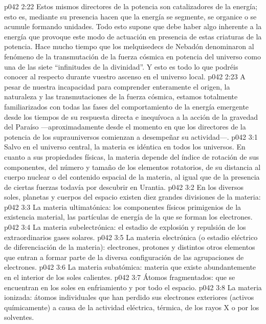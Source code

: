 \vs p042 2:22 Estos mismos directores de la potencia son catalizadores de la energía; esto es, mediante su presencia hacen que la energía se segmente, se organice o se acumule formando unidades. Todo esto supone que debe haber algo inherente a la energía que provoque este modo de actuación en presencia de estas criaturas de la potencia. Hace mucho tiempo que los melquisedecs de Nebadón denominaron al fenómeno de la transmutación de la fuerza cósmica en potencia del universo como una de las siete “infinitudes de la divinidad”. Y esto es todo lo que podréis conocer al respecto durante vuestro ascenso en el universo local.
\vs p042 2:23 \pc A pesar de nuestra incapacidad para comprender enteramente el origen, la naturaleza y las transmutaciones de la fuerza cósmica, estamos totalmente familiarizados con todas las fases del comportamiento de la energía emergente desde los tiempos de su respuesta directa e inequívoca a la acción de la gravedad del Paraíso ---aproximadamente desde el momento en que los directores de la potencia de los suprauniversos comienzan a desempeñar su actividad---.
\vs p042 3:1 Salvo en el universo central, la materia es idéntica en todos los universos. En cuanto a sus propiedades físicas, la materia depende del índice de rotación de sus componentes, del número y tamaño de los elementos rotatorios, de su distancia al cuerpo nuclear o del contenido espacial de la materia, al igual que de la presencia de ciertas fuerzas todavía por descubrir en Urantia.
\vs p042 3:2 En los diversos soles, planetas y cuerpos del espacio existen diez grandes divisiones de la materia:
\vs p042 3:3 La materia ultimatónica: los componentes físicos primigenios de la existencia material, las partículas de energía de la que se forman los electrones.
\vs p042 3:4 La materia subelectrónica: el estadio de explosión y repulsión de los extraordinarios gases solares.
\vs p042 3:5 La materia electrónica (o estadio eléctrico de diferenciación de la materia): electrones, protones y distintos otros elementos que entran a formar parte de la diversa configuración de las agrupaciones de electrones.
\vs p042 3:6 La materia subatómica: materia que existe abundantemente en el interior de los soles calientes.
\vs p042 3:7 Átomos fragmentados: que se encuentran en los soles en enfriamiento y por todo el espacio.
\vs p042 3:8 La materia ionizada: átomos individuales que han perdido sus electrones exteriores (activos químicamente) a causa de la actividad eléctrica, térmica, de los rayos X o por los solventes.
